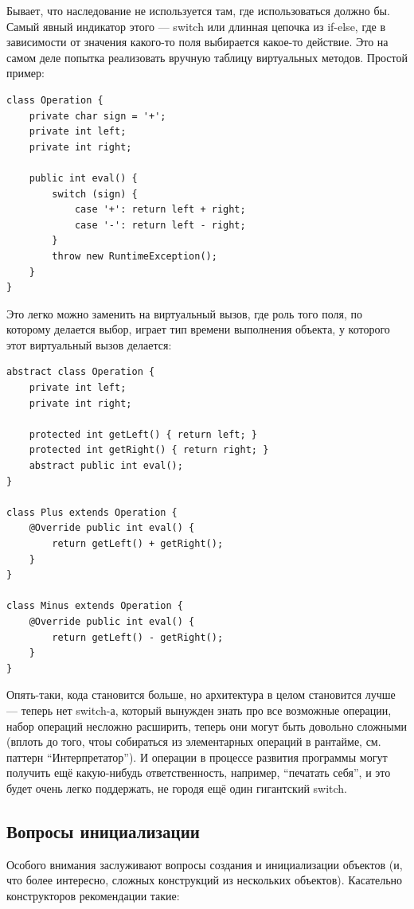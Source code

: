 \documentclass{../../text-style}
\begin{document}
Бывает, что наследование не используется там, где использоваться должно бы. Самый явный индикатор этого --- switch или длинная цепочка из if-else, где в зависимости от значения какого-то поля выбирается какое-то действие. Это на самом деле попытка реализовать вручную таблицу виртуальных методов. Простой пример:

\begin{verbatim}
class Operation {
    private char sign = '+';
    private int left;
    private int right;

    public int eval() {
        switch (sign) {
            case '+': return left + right;
            case '-': return left - right;
        }
        throw new RuntimeException();
    }
}
\end{verbatim}

Это легко можно заменить на виртуальный вызов, где роль того поля, по которому делается выбор, играет тип времени выполнения объекта, у которого этот виртуальный вызов делается:

\begin{verbatim}
abstract class Operation {
    private int left;
    private int right;

    protected int getLeft() { return left; }
    protected int getRight() { return right; }
    abstract public int eval();
}

class Plus extends Operation {
    @Override public int eval() { 
        return getLeft() + getRight(); 
    }
}

class Minus extends Operation {
    @Override public int eval() { 
        return getLeft() - getRight(); 
    }
}
\end{verbatim}

Опять-таки, кода становится больше, но архитектура в целом становится лучше --- теперь нет switch-а, который вынужден знать про все возможные операции, набор операций несложно расширить, теперь они могут быть довольно сложными (вплоть до того, чтоы собираться из элементарных операций в рантайме, см. паттерн ``Интерпретатор''). И операции в процессе развития программы могут получить ещё какую-нибудь ответственность, например, ``печатать себя'', и это будет очень легко поддержать, не городя ещё один гигантский switch.

\subsection{Вопросы инициализации}

Особого внимания заслуживают вопросы создания и инициализации объектов (и, что более интересно, сложных конструкций из нескольких объектов). Касательно конструкторов рекомендации такие:
\end{document}
